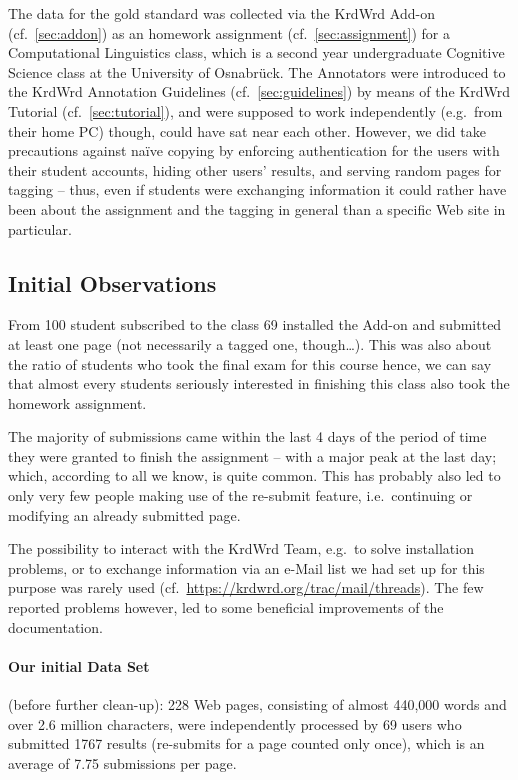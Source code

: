 \begin{longversion}
%
%
The data for the gold standard was collected via the KrdWrd Add-on (cf.~\ref{sec:addon})
as an homework assignment (cf.~\ref{sec:assignment}) for a Computational Linguistics class,
which is a second year undergraduate Cognitive Science class at the University of Osnabr\"{u}ck.
The Annotators were introduced to the KrdWrd Annotation Guidelines (cf.~\ref{sec:guidelines}) by means of the KrdWrd Tutorial (cf.~\ref{sec:tutorial}), and 
were supposed to work independently (e.g.~from their home PC) though, could have sat near each other. 
However, we did take precautions against na\"{i}ve copying by enforcing authentication for the users with their student accounts,
hiding other users' results, and
serving random pages for tagging -- thus, even if students were exchanging information it could rather have been about the assignment and the tagging in general than a specific Web site in particular.

\subsection{Initial Observations}
From 100 student subscribed to the class 69 installed the Add-on and submitted at least one page (not necessarily a tagged one, though\ldots).
This was also about the ratio of students who took the final exam for this course hence, we can say that almost every students seriously interested in finishing this class also took the homework assignment.

The majority of submissions came within the last 4 days of the period of time they were granted to finish the assignment -- with a major peak at the last day;
which, according to all we know, is quite common.
This has probably also led to only very few people making use of the re-submit feature, i.e.~continuing or modifying an already submitted page.

The possibility to interact with the KrdWrd Team, e.g.~to solve installation problems, or to exchange information via an e-Mail list we had set up for this purpose was rarely used (cf.~\url{https://krdwrd.org/trac/mail/threads}).
The few reported problems however, led to some beneficial improvements of the documentation.

\paragraph{Our initial Data Set} (before further clean-up):
228 Web pages, consisting of almost 440,000 words and over 2.6 million characters, were independently processed by
69 users who submitted 
1767 results (re-submits for a page counted only once), which is an average of 7.75 submissions per page. 



\end{longversion}

